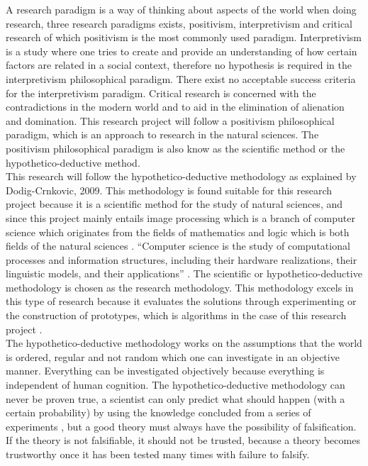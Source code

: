 \documentclass[11pt]{article}
\begin{document}
			A research paradigm is a way of thinking about aspects of the world when doing research, three research paradigms exists, positivism, interpretivism and critical research of which positivism is the most commonly used paradigm. Interpretivism is a study where one tries to create and provide an understanding of how certain factors are related in a social context, therefore no hypothesis is required in the interpretivism philosophical paradigm. There exist no acceptable success criteria for the interpretivism paradigm. Critical research is concerned with the contradictions in the modern world and to aid in the elimination of alienation and domination. This research project will follow a positivism philosophical paradigm, which is an approach to research in the natural sciences. The positivism philosophical paradigm is also know as the scientific method \cite{oates2005researching} or the hypothetico-deductive method.\\

			This research will follow the hypothetico-deductive methodology as explained by Dodig-Crnkovic, 2009. This methodology is found suitable for this research project because it is a scientific method for the study of natural sciences, and since this project mainly entails image processing which is a branch of computer science which originates from the fields of mathematics and logic which is both fields of the natural sciences \cite{tucker2004computer}. ``Computer science is the study of computational processes and information structures, including their hardware realizations, their linguistic models, and their applications'' \cite{tucker2004computer}. The scientific or hypothetico-deductive methodology is chosen as the research methodology. This methodology excels in this type of research because it evaluates the solutions through experimenting or the construction of prototypes, which is algorithms in the case of this research project \cite{dodig2002scientific}. \\

			The hypothetico-deductive methodology works on the assumptions that the world is ordered, regular and not random which one can investigate in an objective manner. Everything can be investigated objectively because everything is independent of human cognition. The hypothetico-deductive methodology can never be proven true, a scientist can only predict what should happen (with a certain probability) by using the knowledge concluded from a series of experiments \cite{oates2005researching}, but a good theory must always have the possibility of falsification. If the theory is not falsifiable, it should not be trusted, because a theory becomes trustworthy once it has been tested many times with failure to falsify.\\
\end{document}
